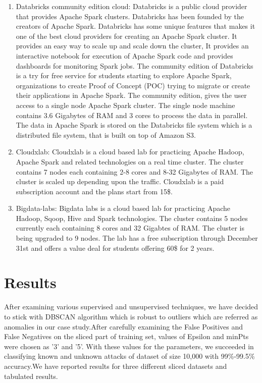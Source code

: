\documentclass{acm_proc_article-sp}
\begin{document}
\begin{enumerate}
\item Databricks community edition cloud: Databricks is a public cloud provider that provides Apache Spark clusters. Databricks has been founded by the creators of Apache Spark. Databricks has some unique features that makes it one of the best cloud providers for creating an Apache Spark cluster. It provides an easy way to scale up and scale down the cluster, It provides an interactive notebook for execution of Apache Spark code and provides dashboards for monitoring Spark jobs. 
The community edition of Databricks is a try for free service for students starting to explore Apache Spark, organizations to create Proof of Concept (POC) trying to migrate or create their applications in Apache Spark.
The community edition, gives the user access to a single node Apache Spark cluster. The single node machine contains 3.6 Gigabytes of RAM and 3 cores to process the data in parallel. The data in Apache Spark is stored on the Databricks file system which is a distributed file system, that is built on top of Amazon S3.

\item Cloudxlab: Cloudxlab is a cloud based lab for practicing Apache Hadoop, Apache Spark and related technologies on a real time cluster. The cluster contains 7 nodes each containing 2-8 cores and 8-32 Gigabytes of RAM. The cluster is scaled up depending upon the traffic. Cloudxlab is a paid subscription account and the plans start from 15\$.

\item Bigdata-labs: Bigdata labs is a cloud based lab for practicing Apache Hadoop, Sqoop, Hive and Spark technologies. The cluster contains 5 nodes currently each containing 8 cores and 32 Gigabtes of RAM. The cluster is being upgraded to 9 nodes. The lab has a free subscription through December 31st and offers a value deal for students offering 60\$ for 2 years. 
\end{enumerate}

\section{Results}
After examining  various supervised and unsupervised techniques, we have decided to stick with DBSCAN algorithm which is robust to outliers which are referred as anomalies in our case study.After carefully examining the False Positives and False Negatives on the sliced part of training set, values of Epsilon and minPts were chosen as '3' and '5'. With these values for the parameters, we succeeded in classifying known and unknown attacks of dataset of size 10,000 with 99\%-99.5\% accuracy.We have reported results for three different sliced datasets and tabulated results.
\end{document}
